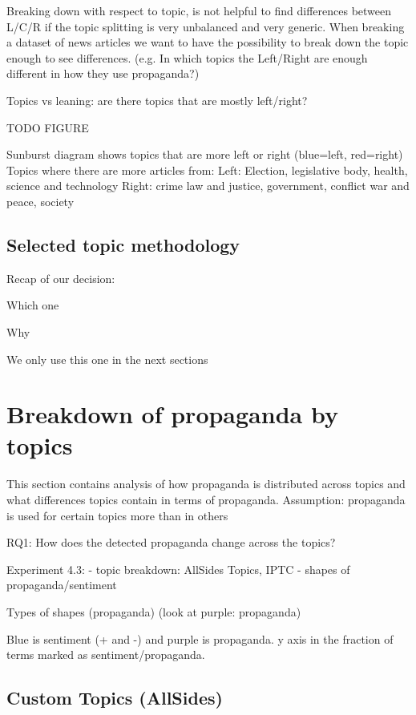 Breaking down with respect to topic, is not helpful to find differences between L/C/R if the topic splitting is very unbalanced and very generic.
When breaking a dataset of news articles we want to have the possibility to break down the topic enough to see differences. (e.g. In which topics the Left/Right are enough different in how they use propaganda?)

Topics vs leaning: are there topics that are mostly left/right?

TODO FIGURE

Sunburst diagram shows topics that are more left or right (blue=left, red=right)
Topics where there are more articles from:
Left: Election, legislative body, health, science and technology
Right: crime law and justice, government, conflict war and peace, society

\subsection{\statusred Selected topic methodology}
\label{ssec:topic_topic_choice}

Recap of our decision:

Which one

Why

We only use this one in the next sections


\section{\statusred Breakdown of propaganda by topics}
\label{sec:topic_propaganda}

This section contains analysis of how propaganda is distributed across topics and what differences topics contain in terms of propaganda.
Assumption: propaganda is used for certain topics more than in others

RQ1: How does the detected propaganda change across the topics?

Experiment 4.3: 
- topic breakdown: AllSides Topics, IPTC
- shapes of propaganda/sentiment 


Types of shapes (propaganda)
(look at purple: propaganda)

Blue is sentiment (+ and -) and purple is propaganda. 
y axis in the fraction of terms marked as sentiment/propaganda.

\subsection{Custom Topics (AllSides)}

